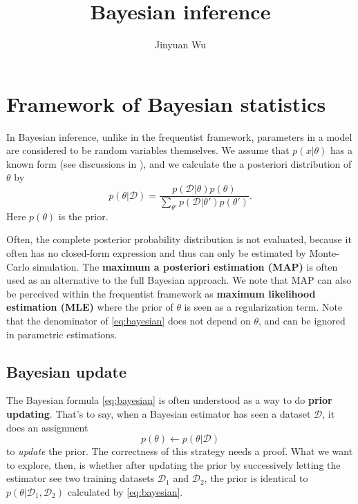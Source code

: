 \documentclass[hyperref, a4paper]{article}
\title{Bayesian inference}
\author{Jinyuan Wu}
\newcommand*{\concept}[1]{{\textbf{#1}}}
\begin{document}
\maketitle

\section{Framework of Bayesian statistics}

In Bayesian inference, unlike in the frequentist framework,
parameters in a model are considered to be random variables themselves.
We assume that $p(x | \theta)$ has a known form
(see discussions in ),
and we calculate the a posteriori distribution of $\theta$ by 
\begin{equation}
    p(\theta | \mathcal{D}) = \frac{p(\mathcal{D} | \theta) p(\theta)}{
        \sum_{\theta'} p(\mathcal{D} | \theta') p(\theta')
    }.
    \label{eq:bayesian}
\end{equation}
Here $p(\theta)$ is the prior.

Often, the complete posterior probability distribution is not evaluated,
because it often has no closed-form expression and thus can only be estimated by Monte-Carlo simulation.
The \concept{maximum a posteriori estimation (MAP)} is often used as an alternative to the full Bayesian approach.
We note that MAP can also be perceived within the frequentist framework 
as \concept{maximum likelihood estimation (MLE)} where the prior of $\theta$ is seen as a regularization term.
Note that the denominator of \eqref{eq:bayesian} does not depend on $\theta$,
and can be ignored in parametric estimations.

\subsection{Bayesian update}

The Bayesian formula \eqref{eq:bayesian} is often understood as a way to do \concept{prior updating}.
That's to say, when a Bayesian estimator has seen a dataset $\mathcal{D}$,
it does an assignment 
\begin{equation}
    p(\theta) \leftarrow p(\theta | \mathcal{D})
    \label{eq:naive-update}
\end{equation}
to \emph{update} the prior.
The correctness of this strategy needs a proof.
What we want to explore, then, is whether after updating the prior
by successively letting the estimator see two training datasets $\mathcal{D}_1$ and $\mathcal{D}_2$,
the prior is identical to $p(\theta | \mathcal{D}_1, \mathcal{D}_2)$ calculated by \eqref{eq:bayesian}.
\end{document}

